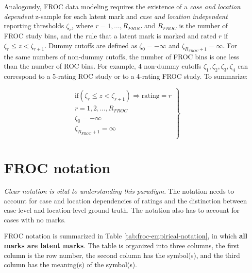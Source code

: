 \documentclass[
]{book}
\begin{document}
Analogously, FROC data modeling requires the existence of a \emph{case and location dependent} z-sample for each latent mark and \emph{case and location independent} reporting thresholds \(\zeta_r\), where \(r = 1, ..., R_{FROC}\) and \(R_{FROC}\) is the number of FROC study bins, and the rule that a latent mark is marked and rated \(r\) if \(\zeta_r \leq z < \zeta_{r+1}\). Dummy cutoffs are defined as \(\zeta_0 = -\infty\) and \(\zeta_{R_{FROC}+1} = \infty\). For the same numbers of non-dummy cutoffs, the number of FROC bins is one less than the number of ROC bins. For example, 4 non-dummy cutoffs \(\zeta_1, \zeta_2, \zeta_3, \zeta_4\) can correspond to a 5-rating ROC study or to a 4-rating FROC study. To summarize:

\begin{equation}
\left.
\begin{aligned}  
\text{if} \left (\zeta_r \le z < \zeta_{r+1}  \right )\Rightarrow \text {rating} = r\\
r = 1, 2, ..., R_{FROC}\\
\zeta_0 = -\infty\\
\zeta_{R_{FROC}+1} = \infty\\
\end{aligned}
\right \}
\label{eq:binning-rule-froc}
\end{equation}

\hypertarget{froc-empirical-notation}{%
\section{FROC notation}\label{froc-empirical-notation}}

\emph{Clear notation is vital to understanding this paradigm.} The notation needs to account for case and location dependencies of ratings and the distinction between case-level and location-level ground truth. The notation also has to account for cases with no marks.

FROC notation is summarized in Table \ref{tab:froc-empirical-notation}, in which \textbf{all marks are latent marks}. The table is organized into three columns, the first column is the row number, the second column has the symbol(s), and the third column has the meaning(s) of the symbol(s).
\end{document}
